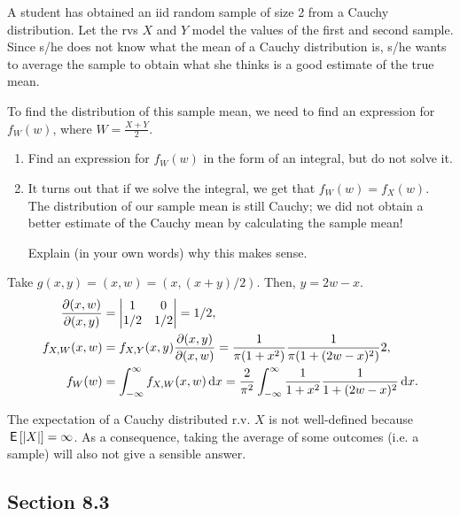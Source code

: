 \begin{exercise}
A student has obtained an iid
random sample of size 2 from a Cauchy distribution. Let the rvs $X$ and $Y$ model the  values of the first and second sample.
Since s/he does not know what the mean of a Cauchy distribution is, s/he wants to average the sample to obtain what she thinks is a good estimate of the true mean.

To find the distribution of this sample mean, we need to find an expression for $f_W(w)$, where $W=\frac{X+Y}2$.

\begin{enumerate}
\item Find an expression for $f_W(w)$ in the form of an integral, but do not solve it.
\item It turns out that if we solve the integral, we get that $f_W(w) = f_X(w)$. The distribution of our sample mean is still Cauchy; we did not obtain a better estimate of the Cauchy mean by calculating the sample mean!

Explain (in your own words) why this makes sense.
\end{enumerate}
\begin{solution}
 Take $g(x,y) = (x, w) = (x, (x+y)/2)$. Then, $y=2w -x$.
\begin{align}
\frac{\partial (x,w)}{\partial (x, y)} &=
  \begin{vmatrix}
    1 & 0 \\
1/2 & 1/2
  \end{vmatrix} = 1/2,\\
f_{X,W}(x,w) &= f_{X,Y}(x,y) \frac{\partial(x,y)}{\partial(x,w)} = \frac{1}{\pi(1+x^{2})}\frac{1}{\pi(1+(2w-x)^{2})} 2,\\
f_{W}(w) &= \int_{-\infty}^{\infty} f_{X,W}(x,w) \,\textrm{d}x = \frac{2}{\pi^{2}} \int_{-\infty}^{\infty} \frac{1}{1+x^{2}}\frac{1}{1+(2w-x)^{2}} \,\textrm{d}x.
\end{align}

The expectation of a Cauchy distributed r.v. $X$ is not well-defined because $\,\mathsf{E}\left[|X|\right] = \infty$. As a consequence, taking the average of some outcomes (i.e. a sample) will also not give a sensible answer.
\end{solution}
\end{exercise}


\subsection*{Section 8.3}
\label{sec:section-8.3}

